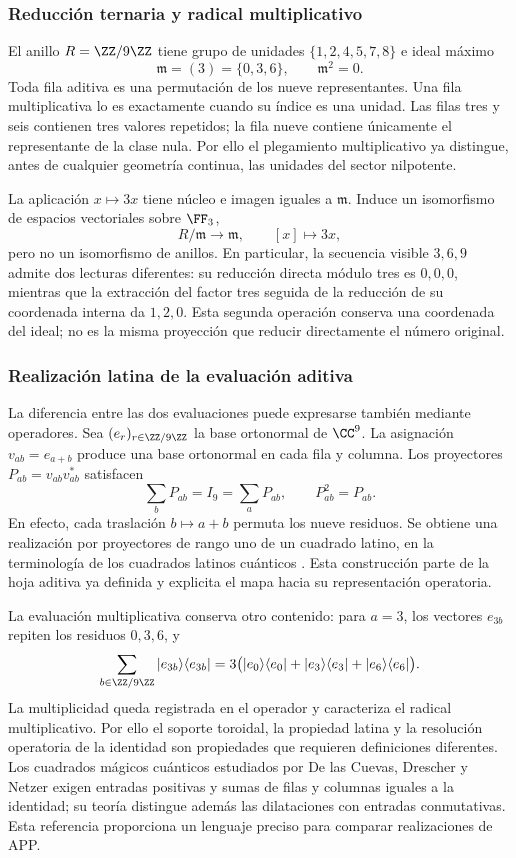 \subsubsection{Reducción ternaria y radical multiplicativo}

El anillo \(R=\ZZ/9\ZZ\) tiene grupo de unidades \(\{1,2,4,5,7,8\}\) e ideal máximo
\[
 \mathfrak m=(3)=\{0,3,6\},\qquad\mathfrak m^2=0.
\]
Toda fila aditiva es una permutación de los nueve representantes. Una fila multiplicativa lo es exactamente cuando su índice es una unidad. Las filas tres y seis contienen tres valores repetidos; la fila nueve contiene únicamente el representante de la clase nula. Por ello el plegamiento multiplicativo ya distingue, antes de cualquier geometría continua, las unidades del sector nilpotente.

La aplicación \(x\mapsto3x\) tiene núcleo e imagen iguales a \(\mathfrak m\). Induce un isomorfismo de espacios vectoriales sobre \(\FF_3\),
\[
 R/\mathfrak m\longrightarrow\mathfrak m,\qquad [x]\longmapsto3x,
\]
pero no un isomorfismo de anillos. En particular, la secuencia visible \(3,6,9\) admite dos lecturas diferentes: su reducción directa módulo tres es \(0,0,0\), mientras que la extracción del factor tres seguida de la reducción de su coordenada interna da \(1,2,0\). Esta segunda operación conserva una coordenada del ideal; no es la misma proyección que reducir directamente el número original.

\subsubsection{Realización latina de la evaluación aditiva}

La diferencia entre las dos evaluaciones puede expresarse también mediante
operadores. Sea \((e_r)_{r\in\ZZ/9\ZZ}\) la base ortonormal de \(\CC^9\).
La asignación \(v_{ab}=e_{a+b}\) produce una base ortonormal en cada fila
y columna. Los proyectores \(P_{ab}=v_{ab}v_{ab}^{*}\) satisfacen
\[
 \sum_bP_{ab}=I_9=\sum_aP_{ab},\qquad P_{ab}^2=P_{ab}.
\]
En efecto, cada traslación \(b\mapsto a+b\) permuta los nueve residuos.
Se obtiene una realización por proyectores de rango uno de un cuadrado
latino, en la terminología de los cuadrados latinos cuánticos
\cite{mustovicary,delascuevas2023}. Esta construcción parte de la hoja
aditiva ya definida y explicita el mapa hacia su representación operatoria.

La evaluación multiplicativa conserva otro contenido: para \(a=3\), los
vectores \(e_{3b}\) repiten los residuos \(0,3,6\), y
\[
 \sum_{b\in\ZZ/9\ZZ}|e_{3b}\rangle\langle e_{3b}|
 =3\bigl(|e_0\rangle\langle e_0|+|e_3\rangle\langle e_3|
                    +|e_6\rangle\langle e_6|\bigr).
\]
La multiplicidad queda registrada en el operador y caracteriza el radical
multiplicativo. Por ello el soporte toroidal, la propiedad latina y la
resolución operatoria de la identidad son propiedades que requieren
definiciones diferentes. Los cuadrados mágicos cuánticos estudiados por
De las Cuevas, Drescher y Netzer exigen entradas positivas y sumas de filas
y columnas iguales a la identidad; su teoría distingue además las
dilataciones con entradas conmutativas\cite{delascuevas2020}. Esta referencia
proporciona un lenguaje preciso para comparar realizaciones de APP.

